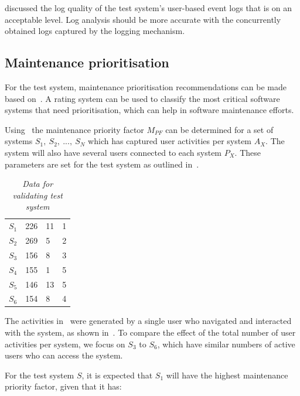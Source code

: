  discussed the log quality of the test system's user-based event logs that is on an acceptable level. Log analysis should be more accurate with the concurrently obtained logs captured by the logging mechanism.

\subsection{Maintenance prioritisation}
For the test system, maintenance prioritisation recommendations can be made based on~. A rating system can be used to classify the most critical software systems that need prioritisation, which can help in software maintenance efforts. \par Using~ the maintenance priority factor $M_{PF}$ can be determined for a set of systems {$S_1,~S_2,~...,~S_N$} which has captured user activities per system $A_X$. The system will also have several users connected to each system $P_X$. These parameters are set for the test system as outlined in~.

\begin{table}[!htb]
	\centering
	\caption[Data for validating test system]
	{\textit{Data for validating test system}}
	\label{tbl:ch3_testData}
	\begin{tabularx}{\textwidth}{XXXX}
		\toprule
		\thead{System ($S_X$)} & \thead{Users per system ($P_X$)} & \thead{Number of events ($A_X$)} & \thead{Expected priority} \\
		\midrule
		\rowcolor{lightgray}
		$S_1$ & 226 & 11 & 1 \\
		$S_2$ & 269 & 5 & 2 \\
		\rowcolor{lightgray}
		$S_3$ & 156 & 8 & 3 \\
		$S_4$ & 155 & 1 & 5 \\
		\rowcolor{lightgray}
		$S_5$ & 146 & 13 & 5 \\
		$S_6$ & 154 & 8 & 4 \\
		\bottomrule
	\end{tabularx}
\end{table}

The activities in~ were generated by a single user who navigated and interacted with the system, as shown in~. To compare the effect of the total number of user activities per system, we focus on $S_3$ to $S_6$, which have similar numbers of active users who can access the system.\par For the test system $S$, it is expected that $S_1$ will have the highest maintenance priority factor, given that it has:


